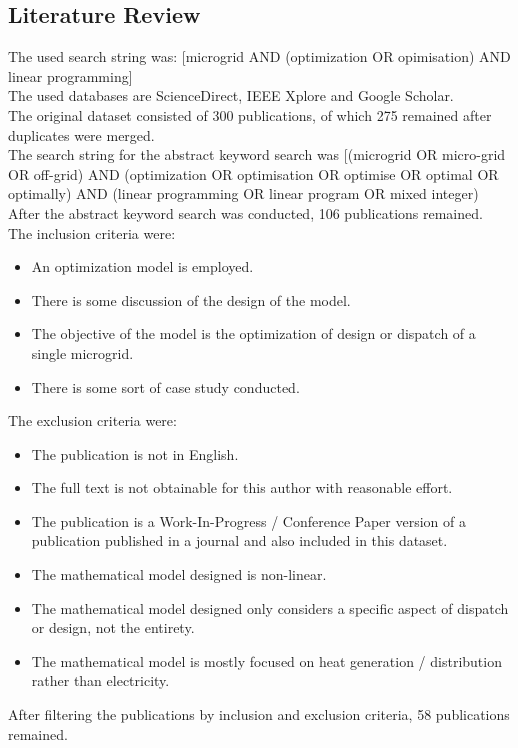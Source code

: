 \documentclass[
	11pt,								%
	DIV10,								%
	a4paper,         					%
	oneside,							%
	headheight=20pt,					%
	footheight=20pt,					%
    parskip=full,						%
    listof=totoc,						%
	bibliography=totoc,					%
	index=totoc,						%
]{scrartcl}
\begin{document}
\subsection{Literature Review}
The used search string was:  [microgrid AND (optimization OR opimisation) AND linear programming]
\\
The used databases are ScienceDirect, IEEE Xplore and Google Scholar.
\\
The original dataset consisted of 300 publications, of which 275 remained after duplicates were merged.
\\
The search string for the abstract keyword search was [(microgrid OR micro-grid OR off-grid) AND (optimization OR optimisation OR optimise OR optimal OR optimally) AND (linear programming OR linear program OR mixed integer)
\\
After the abstract keyword search was conducted, 106 publications remained.
\\
The inclusion criteria were:
\begin{itemize}
	\item An optimization model is employed.
	\item There is some discussion of the design of the model.
	\item The objective of the model is the optimization of design or dispatch of a single microgrid.
	\item There is some sort of case study conducted.
\end{itemize}
The exclusion criteria were:
\begin{itemize}
	\item The publication is not in English.
	\item The full text is not obtainable for this author with reasonable effort.
	\item The publication is a Work-In-Progress / Conference Paper version of a publication published in a journal and also included in this dataset.
	\item The mathematical model designed is non-linear.
	\item The mathematical model designed only considers a specific aspect of dispatch or design, not the entirety.
	\item The mathematical model is mostly focused on heat generation / distribution rather than electricity.
\end{itemize}
After filtering the publications by inclusion and exclusion criteria, 58 publications remained.


\newpage								%
\renewcommand\refname{Literature}			%
\printbibliography
\end{document}
